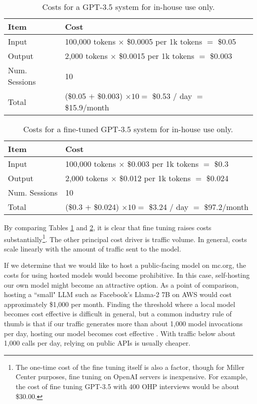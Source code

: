 \documentclass[12pt, oneside]{article}   	%
\begin{document}
\begin{table}[htp]
\caption{Costs for a GPT-3.5 system for in-house use only.}
\begin{center}
\begin{tabular}{p{1.55in} p{4in}}
\toprule
Item			&		Cost	\\
\midrule
Input			&	100,000 tokens $\times$ \$0.0005 per 1k tokens $=$ \$0.05	\\
\midrule
Output		&	2,000 tokens $\times$ \$0.0015 per 1k tokens $=$ \$0.003	\\
\midrule
Num. Sessions	&	10	\\
\bottomrule			
Total			&	(\$0.05 $+$ \$0.003)	$\times 10 =$ \$0.53 / day $=$ \$15.9/month	\\
\bottomrule
\end{tabular}
\end{center}
\label{table.cost.one}
\end{table}%

\begin{table}[htp]
\caption{Costs for a fine-tuned GPT-3.5 system for in-house use only.}
\begin{center}
\begin{tabular}{p{1.55in} p{4in}}
\toprule
Item			&		Cost	\\
\midrule
Input			&	100,000 tokens $\times$ \$0.003 per 1k tokens $=$ \$0.3	\\
\midrule
Output		&	2,000 tokens $\times$ \$0.012 per 1k tokens $=$ \$0.024	\\
\midrule
Num. Sessions	&	10	\\
\bottomrule			
Total			&	(\$0.3 $+$ \$0.024)	$\times 10 =$ \$3.24 / day $=$ \$97.2/month	\\
\bottomrule
\end{tabular}
\end{center}
\label{table.cost.two}
\end{table}%

By comparing Tables \ref{table.cost.one} and \ref{table.cost.two}, it is clear that fine tuning raises costs substantially\footnote{The one-time cost of the fine tuning itself is also a factor, though for Miller Center purposes, fine tuning on OpenAI servers is inexpensive.  For example, the cost of fine tuning GPT-3.5 with 400 OHP interviews would be about \$30.00.}.  The other principal cost driver is traffic volume.  In general, costs scale linearly with the amount of traffic sent to the model.  

If we determine that we would like to host a public-facing model on mc.org, the costs for using hosted models would become prohibitive.  In this case, self-hosting our own model  might become an attractive option.  As a point of comparison, hosting a ``small" LLM such as Facebook's Llama-2 7B on AWS would cost approximately \$1,000 per month.  Finding the threshold where a local model becomes cost effective is difficult in general, but a  common industry rule of thumb is that if our traffic generates more than about 1,000 model invocations per day, hosting our model becomes cost effective \cite{vivek:2023, javaness:2023}.  With traffic below about 1,000 calls per day, relying on public APIs is usually cheaper.  
\end{document}
